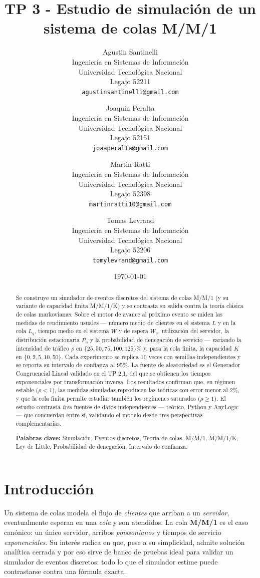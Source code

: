 \documentclass[11pt]{article}
\title{\textbf{TP 3 - Estudio de simulaci\'on de un sistema de colas
M/M/1}}
\author{
  Agustin Santinelli \\
  Ingenier\'ia en Sistemas de Informaci\'on \\
  Universidad Tecnol\'ogica Nacional \\
  Legajo 52211 \\
  \texttt{agustinsantinelli@gmail.com}
  \and
  Joaquin Peralta \\
  Ingenier\'ia en Sistemas de Informaci\'on \\
  Universidad Tecnol\'ogica Nacional \\
  Legajo 52151 \\
  \texttt{joaaperalta@gmail.com}
  \and
  Martin Ratti \\
  Ingenier\'ia en Sistemas de Informaci\'on \\
  Universidad Tecnol\'ogica Nacional \\
  Legajo 52398 \\
  \texttt{martinratti10@gmail.com}
  \and
  Tomas Levrand \\
  Ingenier\'ia en Sistemas de Informaci\'on \\
  Universidad Tecnol\'ogica Nacional \\
  Legajo 52206 \\
  \texttt{tomylevrand@gmail.com}
}
\date{\today}
\begin{document}
\maketitle

\begin{abstract}
\noindent Se construye un simulador de eventos discretos del sistema de
colas M/M/1 (y su variante de capacidad finita M/M/1/K) y se contrasta su
salida contra la teor\'ia cl\'asica de colas markovianas. Sobre el motor de
avance al pr\'oximo evento se miden las medidas de rendimiento usuales ---
n\'umero medio de clientes en el sistema $L$ y en la cola $L_q$, tiempo
medio en el sistema $W$ y de espera $W_q$, utilizaci\'on del servidor, la
distribuci\'on estacionaria $P_n$ y la probabilidad de denegaci\'on de
servicio --- variando la intensidad de tr\'afico $\rho$ en
$\{25, 50, 75, 100, 125\}\%$ y, para la cola finita, la capacidad $K$ en
$\{0, 2, 5, 10, 50\}$. Cada experimento se replica $10$ veces con semillas
independientes y se reporta su intervalo de confianza al $95\%$. La fuente
de aleatoriedad es el Generador Congruencial Lineal validado en el TP 2.1,
del que se obtienen los tiempos exponenciales por transformaci\'on inversa.
Los resultados confirman que, en r\'egimen estable ($\rho < 1$), las medidas
simuladas reproducen las te\'oricas con error menor al $2\%$, y que la cola
finita permite estudiar tambi\'en los reg\'imenes saturados
($\rho \ge 1$). El estudio contrasta \emph{tres} fuentes de datos
independientes --- te\'orico, Python y AnyLogic --- que concuerdan entre s\'i,
validando el modelo desde tres perspectivas complementarias.

\vspace{0.5em}
\noindent\textbf{Palabras clave:} Simulaci\'on, Eventos discretos, Teor\'ia
de colas, M/M/1, M/M/1/K, Ley de Little, Probabilidad de denegaci\'on,
Intervalo de confianza.
\end{abstract}

\section{Introducci\'on}

Un sistema de colas modela el flujo de \emph{clientes} que arriban a un
\emph{servidor}, eventualmente esperan en una \emph{cola} y son atendidos.
La cola \textbf{M/M/1} es el caso can\'onico: un \'unico servidor, arribos
\emph{poissonianos} y tiempos de servicio \emph{exponenciales}. Su inter\'es
radica en que, pese a su simplicidad, admite soluci\'on anal\'itica cerrada
y por eso sirve de banco de pruebas ideal para validar un simulador de
eventos discretos: todo lo que el simulador estime puede contrastarse contra
una f\'ormula exacta.
\end{document}
